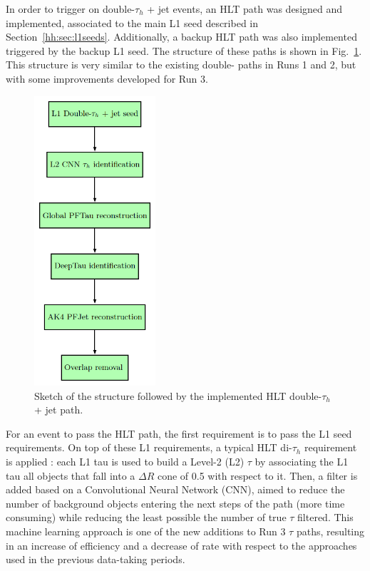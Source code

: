 \documentclass[../main.tex]{subfiles}
\begin{document}
In order to trigger on double-$\tau_h$ + jet events, an HLT path was designed and implemented, associated to the main L1 seed described in Section~\ref{hh:sec:l1seeds}. Additionally, a backup HLT path was also implemented triggered by the backup L1 seed. The structure of these paths is shown in Fig.~\ref{hh:fig:hlt_path}. This structure is very similar to the existing double-\tauh{} paths in Runs 1 and 2, but with some improvements developed for Run 3.

\begin{figure}
\begin{center}
\includegraphics[width=0.4\textwidth]{Images/HLT_Path}
\end{center}
\caption[HLT path structure]{Sketch of the structure followed by the implemented HLT double-$\tau_h$ + jet path.}
\label{hh:fig:hlt_path}
\end{figure}

For an event to pass the HLT path, the first requirement is to pass the L1 seed requirements. On top of these L1 requirements, a typical HLT di-$\tau_h$ requirement is applied \cite{intro:exp:cms_trigger}: each L1 tau is used to build a Level-2 (L2) $\tau$ by associating the L1 tau all objects that fall into a $\Delta R$ cone of 0.5 with respect to it. Then, a filter is added based on a Convolutional Neural Network (CNN), aimed to reduce the number of background objects entering the next steps of the path (more time consuming) while reducing the least possible the number of true $\tau$ filtered. This machine learning approach is one of the new additions to Run 3 $\tau$ paths, resulting in an increase of efficiency and a decrease of rate with respect to the approaches used in the previous data-taking periods. 
\end{document}
